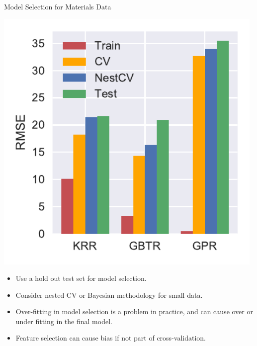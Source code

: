 \documentclass[final]{beamer}
\newlength{\onecolwid}
\begin{document}
\begin{frame}[t]
\begin{columns}[t]
\begin{column}{\onecolwid}
\begin{block}{Model Selection for Materials Data}
\begin{table}[ht]
\begin{minipage}[b]{0.39\textwidth}
    \includegraphics[width=0.98\textwidth]{plots/errors-3x3.pdf}
  \end{minipage}
    \label{tbl:overfit}
    \vspace{-2em}
    \caption{Comparing prediction errors of an over-fit model.
    Model selection CV estimates can seriously underestimate true test error.
    Predicting bulk modulus based on 140 compositional and structural features, from matminer's ElementProperty and density featurizers, with a Kernel Ridge Regression (KRR), Gradient Boosted Tree Regression (GBTR), and a Gaussian Process Regression (GPR). Error is RMSE in GPa. }
\end{table}

\vspace{-1em}

\begin{itemize}
    \item Use a hold out test set for model selection.
    \item Consider nested CV or Bayesian methodology for small data.
    \item Over-fitting in model selection is a problem in practice, and can cause over or under fitting in the final model.
    \item Feature selection can cause bias if not part of cross-validation.
\end{itemize}


\end{block}
\end{column}
\end{columns}
\end{frame}
\end{document}
